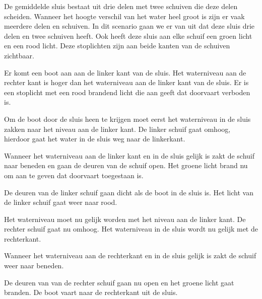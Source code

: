 \documentclass[../verslag.tex]{subfiles}
\begin{document}
De gemiddelde sluis bestaat uit drie delen met twee schuiven die deze delen scheiden. Wanneer het hoogte verschil van het water heel groot is zijn er vaak meerdere delen en schuiven. In dit scenario gaan we er van uit dat deze sluis drie delen en twee schuiven heeft. Ook heeft deze sluis aan elke schuif een groen licht en een rood licht. Deze stoplichten zijn aan beide kanten van de schuiven zichtbaar.

Er komt een boot aan aan de linker kant van de sluis. Het waterniveau aan de rechter kant is hoger dan het waterniveau aan de linker kant van de sluis. Er is een stoplicht met een rood brandend licht die aan geeft dat doorvaart verboden is.

Om de boot door de sluis heen te krijgen moet eerst het waterniveau in de sluis zakken naar het niveau aan de linker kant. De linker schuif gaat omhoog, hierdoor gaat het water in de sluis weg naar de linkerkant.

Wanneer het waterniveau aan de linker kant en in de sluis gelijk is zakt de schuif naar beneden en gaan de deuren van de schuif open. Het groene licht brand nu om aan te geven dat doorvaart toegestaan is.

De deuren van de linker schuif gaan dicht als de boot in de sluis is. Het licht van de linker schuif gaat weer naar rood.

Het waterniveau moet nu gelijk worden met het niveau aan de linker kant. De rechter schuif gaat nu omhoog. Het waterniveau in de sluis wordt nu gelijk met de rechterkant.

Wanneer het waterniveau aan de rechterkant en in de sluis gelijk is zakt de schuif weer naar beneden.

De deuren van van de rechter schuif gaan nu open en het groene licht gaat branden. De boot vaart naar de rechterkant uit de sluis.
\end{document}
